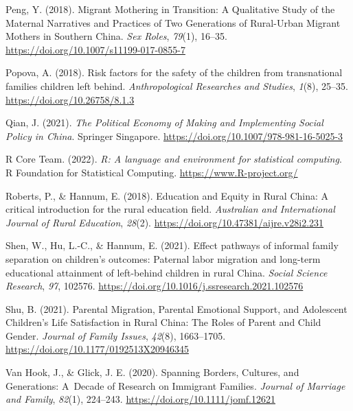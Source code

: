 \documentclass[
  man,floatsintext]{apa7}
\newlength{\cslhangindent}
\newlength{\cslentryspacingunit} %
\newenvironment{CSLReferences}[2] %
 {%
  \setlength{\parindent}{0pt}
  \ifodd #1
  \let\oldpar\par
  \def\par{\hangindent=\cslhangindent\oldpar}
  \fi
  \setlength{\parskip}{#2\cslentryspacingunit}
 }%
 {}
\begin{document}
\begin{CSLReferences}{1}{0}
\leavevmode{}%
Peng, Y. (2018). Migrant Mothering in Transition: A Qualitative Study of the Maternal Narratives and Practices of Two Generations of Rural-Urban Migrant Mothers in Southern China. \emph{Sex Roles}, \emph{79}(1), 16--35. \url{https://doi.org/10.1007/s11199-017-0855-7}

\leavevmode{}%
Popova, A. (2018). Risk factors for the safety of the children from transnational families children left behind. \emph{Anthropological Researches and Studies}, \emph{1}(8), 25--35. \url{https://doi.org/10.26758/8.1.3}

\leavevmode{}%
Qian, J. (2021). \emph{The Political Economy of Making and Implementing Social Policy in China}. Springer Singapore. \url{https://doi.org/10.1007/978-981-16-5025-3}

\leavevmode{}%
R Core Team. (2022). \emph{R: A language and environment for statistical computing}. R Foundation for Statistical Computing. \url{https://www.R-project.org/}

\leavevmode{}%
Roberts, P., \& Hannum, E. (2018). Education and Equity in Rural China: A critical introduction for the rural education field. \emph{Australian and International Journal of Rural Education}, \emph{28}(2). \url{https://doi.org/10.47381/aijre.v28i2.231}

\leavevmode{}%
Shen, W., Hu, L.-C., \& Hannum, E. (2021). Effect pathways of informal family separation on children's outcomes: Paternal labor migration and long-term educational attainment of left-behind children in rural China. \emph{Social Science Research}, \emph{97}, 102576. \url{https://doi.org/10.1016/j.ssresearch.2021.102576}

\leavevmode{}%
Shu, B. (2021). Parental Migration, Parental Emotional Support, and Adolescent Children{'}s Life Satisfaction in Rural China: The Roles of Parent and Child Gender. \emph{Journal of Family Issues}, \emph{42}(8), 1663--1705. \url{https://doi.org/10.1177/0192513X20946345}

\leavevmode{}%
Van Hook, J., \& Glick, J. E. (2020). Spanning Borders, Cultures, and Generations: A~Decade of Research on Immigrant Families. \emph{Journal of Marriage and Family}, \emph{82}(1), 224--243. \url{https://doi.org/10.1111/jomf.12621}


\end{CSLReferences}
\end{document}
